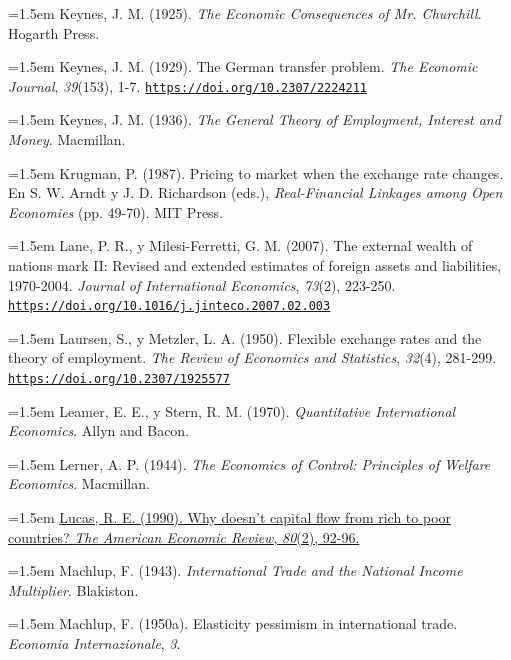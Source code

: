 \documentclass[10pt,a4paper]{article}
\begin{document}
\noindent\hangindent=1.5em Keynes, J. M. (1925). \textit{The Economic Consequences of Mr. Churchill}. Hogarth Press.

\noindent\hangindent=1.5em Keynes, J. M. (1929). The German transfer problem. \textit{The Economic Journal}, \textit{39}(153), 1-7. \href{https://doi.org/10.2307/2224211}{\nolinkurl{https://doi.org/10.2307/2224211}}

\noindent\hangindent=1.5em Keynes, J. M. (1936). \textit{The General Theory of Employment, Interest and Money}. Macmillan.

\noindent\hangindent=1.5em Krugman, P. (1987). Pricing to market when the exchange rate changes. En S. W. Arndt y J. D. Richardson (eds.), \textit{Real-Financial Linkages among Open Economies} (pp. 49-70). MIT Press.

\noindent\hangindent=1.5em Lane, P. R., y Milesi-Ferretti, G. M. (2007). The external wealth of nations mark II: Revised and extended estimates of foreign assets and liabilities, 1970-2004. \textit{Journal of International Economics}, \textit{73}(2), 223-250. \href{https://doi.org/10.1016/j.jinteco.2007.02.003}{\nolinkurl{https://doi.org/10.1016/j.jinteco.2007.02.003}}

\noindent\hangindent=1.5em Laursen, S., y Metzler, L. A. (1950). Flexible exchange rates and the theory of employment. \textit{The Review of Economics and Statistics}, \textit{32}(4), 281-299. \href{https://doi.org/10.2307/1925577}{\nolinkurl{https://doi.org/10.2307/1925577}}

\noindent\hangindent=1.5em Leamer, E. E., y Stern, R. M. (1970). \textit{Quantitative International Economics}. Allyn and Bacon.

\noindent\hangindent=1.5em Lerner, A. P. (1944). \textit{The Economics of Control: Principles of Welfare Economics}. Macmillan.

\noindent\hangindent=1.5em \href{https://ideas.repec.org/a/aea/aecrev/v80y1990i2p92-96.html}{Lucas, R. E. (1990). Why doesn't capital flow from rich to poor countries? \textit{The American Economic Review}, \textit{80}(2), 92-96.}

\noindent\hangindent=1.5em Machlup, F. (1943). \textit{International Trade and the National Income Multiplier}. Blakiston.

\noindent\hangindent=1.5em Machlup, F. (1950a). Elasticity pessimism in international trade. \textit{Economia Internazionale}, \textit{3}.
\end{document}
